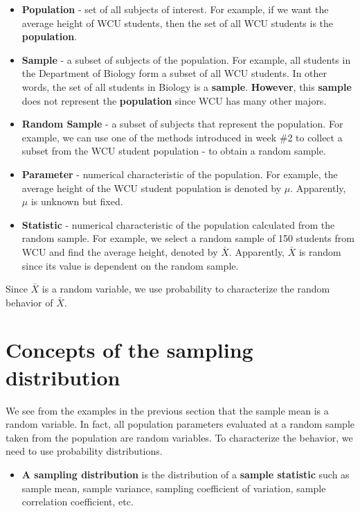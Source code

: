 \documentclass[
]{book}
\providecommand{\tightlist}{%
  \setlength{\itemsep}{0pt}\setlength{\parskip}{0pt}}
\begin{document}
\begin{itemize}
\item
  \textbf{Population} - set of all subjects of interest. For example, if we want the average height of WCU students, then the set of all WCU students is the \textbf{population}.
\item
  \textbf{Sample} - a subset of subjects of the population. For example, all students in the Department of Biology form a subset of all WCU students. In other words, the set of all students in Biology is a \textbf{sample}. \textbf{However}, this \textbf{sample} does not represent the \textbf{population} since WCU has many other majors.
\item
  \textbf{Random Sample} - a subset of subjects that represent the population. For example, we can use one of the methods introduced in week \#2 to collect a subset from the WCU student population - to obtain a random sample.
\item
  \textbf{Parameter} - numerical characteristic of the population. For example, the average height of the WCU student population is denoted by \(\mu\). Apparently, \(\mu\) is unknown but fixed.
\item
  \textbf{Statistic} - numerical characteristic of the population calculated from the random sample. For example, we select a random sample of 150 students from WCU and find the average height, denoted by \(\bar{X}\). Apparently, \(\bar{X}\) is random since its value is dependent on the random sample.
\end{itemize}

Since \(\bar{X}\) is a random variable, we use probability to characterize the random behavior of \(\bar{X}\).

\hypertarget{concepts-of-the-sampling-distribution}{%
\section{Concepts of the sampling distribution}\label{concepts-of-the-sampling-distribution}}

We see from the examples in the previous section that the sample mean is a random variable. In fact, all population parameters evaluated at a random sample taken from the population are random variables. To characterize the behavior, we need to use probability distributions.

\begin{itemize}
\tightlist
\item
  \textbf{A sampling distribution} is the distribution of a \textbf{sample statistic} such as sample mean, sample variance, sampling coefficient of variation, sample correlation coefficient, etc.
\end{itemize}
\end{document}
